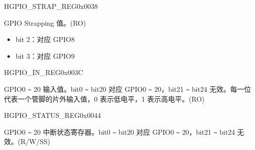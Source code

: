 \begin{register}{H}{GPIO\_STRAP\_REG}{0x0038}\label{regdesc:GPIOSTRAPREG}
%
%
\regnewline%
\begin{regdesc}\begin{reglist}
\label{fielddesc:GPIOSTRAPPING}\item [GPIO\_STRAPPING] GPIO Strapping 值。(RO)
\begin{itemize}
    \item bit 2：对应 GPIO8
    \item bit 3：对应 GPIO9
\end{itemize}
\end{reglist}\end{regdesc}
\end{register}


\begin{register}{H}{GPIO\_IN\_REG}{0x003C}\label{regdesc:GPIOINREG}
%
%
\regnewline%
\begin{regdesc}\begin{reglist}
\label{fielddesc:GPIOINDATANEXT}\item [GPIO\_IN\_DATA\_NEXT] GPIO0 \verb+~+ 20 输入值。bit0 \verb+~+ bit20 对应 GPIO0 \verb+~+ 20，bit21 \verb+~+ bit24 无效。每一位代表一个管脚的片外输入值，0 表示低电平，1 表示高电平。(RO)
\end{reglist}\end{regdesc}
\end{register}


\begin{register}{H}{GPIO\_STATUS\_REG}{0x0044}\label{regdesc:GPIOSTATUSREG}
%
%
\regnewline%
\begin{regdesc}\begin{reglist}
\label{fielddesc:GPIOSTATUSINTERRUPT}\item [GPIO\_STATUS\_INTERRUPT] GPIO0 \verb+~+ 20 中断状态寄存器。bit0 \verb+~+ bit20 对应 GPIO0 \verb+~+ 20，bit21 \verb+~+ bit24 无效。(R/W/SS)
\end{reglist}\end{regdesc}
\end{register}


